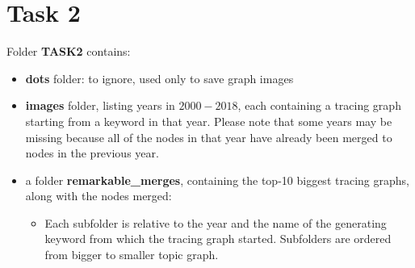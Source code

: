 \documentclass[11pt]{article}
\begin{document}
\newpage

\section{Task 2}
Folder \textbf{TASK2} contains:
\begin{itemize}
	\item \textbf{dots} folder: to ignore, used only to save graph images
	\item \textbf{images} folder, listing years in $2000-2018$, each containing a tracing graph starting from a keyword in that year. Please note that some years may be missing because all of the nodes in that year have already been merged to nodes in the previous year.
	\item a folder \textbf{remarkable\_merges}, containing the top-10 biggest tracing graphs, along with the nodes merged:
		\begin{itemize}
			\item Each subfolder is relative to the year and the name of the generating keyword from which the tracing graph started. Subfolders are ordered from bigger to smaller topic graph.
		\end{itemize}
\end{itemize}
\end{document}
